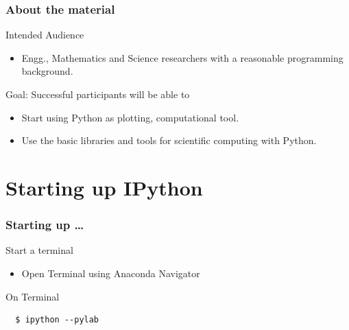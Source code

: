 \documentclass[14pt,compress]{beamer}
\begin{document}
\begin{frame}
  \frametitle{About the material}
  \begin{block}{Intended Audience}
  \begin{itemize}
       \item Engg., Mathematics and Science researchers with a
           reasonable programming background.
  \end{itemize}
  \end{block}

  \begin{block}{Goal: Successful participants will be able to}
    \begin{itemize}
      \item Start using Python as plotting, computational tool.
      \item Use the basic libraries and tools for scientific computing
          with Python.
    \end{itemize}
  \end{block}
\end{frame}


\section{Starting up IPython}
\begin{frame}[fragile]
\frametitle{Starting up \ldots}
\begin{block}{Start a terminal}
  \begin{itemize}
    \item Open Terminal using Anaconda Navigator
\end{itemize}
\end{block}

\begin{block}{On Terminal}
\begin{lstlisting}
  $ ipython --pylab
\end{lstlisting} %
\end{block}
\end{frame}
\end{document}
